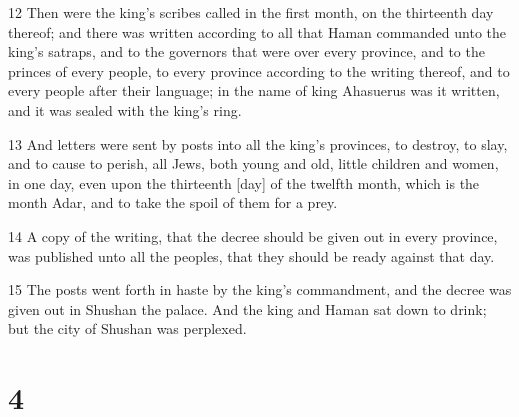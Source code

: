 \par 12 Then were the king's scribes called in the first month, on the thirteenth day thereof; and there was written according to all that Haman commanded unto the king's satraps, and to the governors that were over every province, and to the princes of every people, to every province according to the writing thereof, and to every people after their language; in the name of king Ahasuerus was it written, and it was sealed with the king's ring.
\par 13 And letters were sent by posts into all the king's provinces, to destroy, to slay, and to cause to perish, all Jews, both young and old, little children and women, in one day, even upon the thirteenth [day] of the twelfth month, which is the month Adar, and to take the spoil of them for a prey.
\par 14 A copy of the writing, that the decree should be given out in every province, was published unto all the peoples, that they should be ready against that day.
\par 15 The posts went forth in haste by the king's commandment, and the decree was given out in Shushan the palace. And the king and Haman sat down to drink; but the city of Shushan was perplexed.

\chapter{4}

